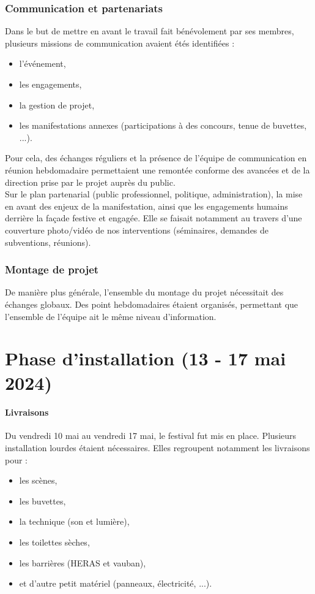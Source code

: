 \documentclass[12pt,a4paper]{report}
\begin{document}
\subsubsection{Communication et partenariats}
Dans le but de mettre en avant le travail fait bénévolement par ses membres, plusieurs missions de communication avaient étés identifiées :
\begin{itemize}
\item l'événement,
\item les engagements,
\item la gestion de projet,
\item les manifestations annexes (participations à des concours, tenue de buvettes, ...).\\
\end{itemize}

Pour cela, des échanges réguliers et la présence de l'équipe de communication en réunion hebdomadaire permettaient une remontée conforme des avancées et de la direction prise par le projet auprès du public.\\

Sur le plan partenarial (public professionnel, politique, administration), la mise en avant des enjeux de la manifestation, ainsi que les engagements humains derrière la façade festive et engagée. Elle se faisait notamment au travers d'une couverture photo/vidéo de nos interventions (séminaires, demandes de subventions, réunions).


\subsubsection{Montage de projet}
De manière plus générale, l'ensemble du montage du projet nécessitait des échanges globaux. Des point hebdomadaires étaient organisés, permettant que l'ensemble de l'équipe ait le même niveau d'information.

\section{Phase d'installation (13 - 17 mai 2024)}

\paragraph{Livraisons}

Du vendredi 10 mai au vendredi 17 mai, le festival fut mis en place. Plusieurs installation lourdes étaient nécessaires. Elles regroupent notamment les livraisons pour : 
\begin{itemize}
\item les scènes,
\item les buvettes,
\item la technique (son et lumière),
\item les toilettes sèches, 
\item les barrières (HERAS et vauban),
\item et d'autre petit matériel (panneaux, électricité, ...).
\end{itemize}
\end{document}
